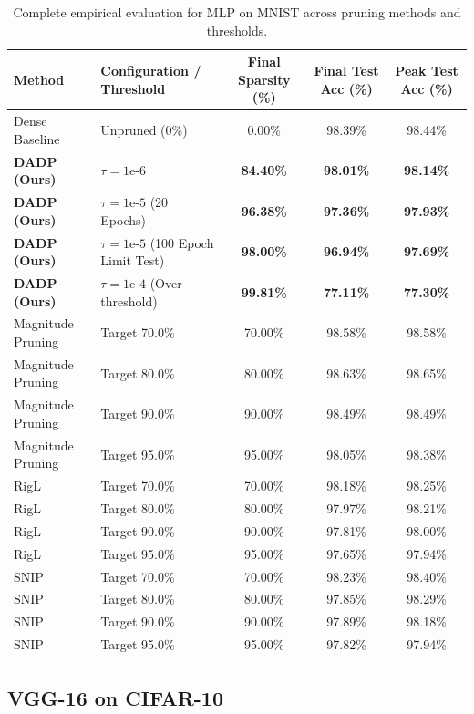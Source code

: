 \begin{table}[H]
\caption{Complete empirical evaluation for MLP on MNIST across pruning methods and thresholds.}
\label{tab:app_mlp_mnist}
\centering
\small
\begin{tabular}{llccc}
\toprule
\textbf{Method} & \textbf{Configuration / Threshold} & \textbf{Final Sparsity (\%)} & \textbf{Final Test Acc (\%)} & \textbf{Peak Test Acc (\%)} \\
\midrule
Dense Baseline & Unpruned (0\%) & 0.00\% & 98.39\% & 98.44\% \\
\textbf{DADP (Ours)} & $\tau = 1\text{e-}6$ & \textbf{84.40\%} & \textbf{98.01\%} & \textbf{98.14\%} \\
\textbf{DADP (Ours)} & $\tau = 1\text{e-}5$ (20 Epochs) & \textbf{96.38\%} & \textbf{97.36\%} & \textbf{97.93\%} \\
\textbf{DADP (Ours)} & $\tau = 1\text{e-}5$ (100 Epoch Limit Test) & \textbf{98.00\%} & \textbf{96.94\%} & \textbf{97.69\%} \\
\textbf{DADP (Ours)} & $\tau = 1\text{e-}4$ (Over-threshold) & \textbf{99.81\%} & \textbf{77.11\%} & \textbf{77.30\%} \\
\midrule
Magnitude Pruning & Target 70.0\% & 70.00\% & 98.58\% & 98.58\% \\
Magnitude Pruning & Target 80.0\% & 80.00\% & 98.63\% & 98.65\% \\
Magnitude Pruning & Target 90.0\% & 90.00\% & 98.49\% & 98.49\% \\
Magnitude Pruning & Target 95.0\% & 95.00\% & 98.05\% & 98.38\% \\
\midrule
RigL & Target 70.0\% & 70.00\% & 98.18\% & 98.25\% \\
RigL & Target 80.0\% & 80.00\% & 97.97\% & 98.21\% \\
RigL & Target 90.0\% & 90.00\% & 97.81\% & 98.00\% \\
RigL & Target 95.0\% & 95.00\% & 97.65\% & 97.94\% \\
\midrule
SNIP & Target 70.0\% & 70.00\% & 98.23\% & 98.40\% \\
SNIP & Target 80.0\% & 80.00\% & 97.85\% & 98.29\% \\
SNIP & Target 90.0\% & 90.00\% & 97.89\% & 98.18\% \\
SNIP & Target 95.0\% & 95.00\% & 97.82\% & 97.94\% \\
\bottomrule
\end{tabular}
\end{table}

\subsection{VGG-16 on CIFAR-10}

